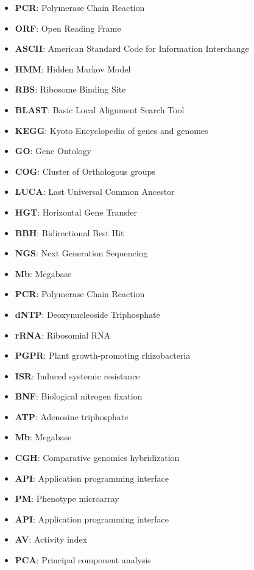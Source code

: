 \begin{itemize}
\item \textbf{PCR}: Polymerase Chain Reaction
\item \textbf{ORF}: Open Reading Frame
\item \textbf{ASCII}: American Standard Code for Information Interchange
\item \textbf{HMM}: Hidden Markov Model
\item \textbf{RBS}: Ribosome Binding Site
\item \textbf{BLAST}: Basic Local Alignment Search Tool
\item \textbf{KEGG}: Kyoto Encyclopedia of genes and genomes
\item \textbf{GO}: Gene Ontology
\item \textbf{COG}: Cluster of Orthologous groups
\item \textbf{LUCA}: Last Universal Common Ancestor
\item \textbf{HGT}: Horizontal Gene Transfer
\item \textbf{BBH}: Bidirectional Best Hit
\item \textbf{NGS}: Next Generation Sequencing
\item \textbf{Mb}: Megabase
\item \textbf{PCR}: Polymerase Chain Reaction
\item \textbf{dNTP}: Deoxynucleoside Triphosphate
\item \textbf{rRNA}: Ribosomial RNA
\item \textbf{PGPR}: Plant growth-promoting rhizobacteria
\item \textbf{ISR}: Induced systemic resistance
\item \textbf{BNF}: Biological nitrogen fixation
\item \textbf{ATP}: Adenosine triphosphate
\item \textbf{Mb}: Megabase
\item \textbf{CGH}: Comparative genomics hybridization
\item \textbf{API}: Application programming interface
\item \textbf{PM}: Phenotype microarray
\item \textbf{API}: Application programming interface
\item \textbf{AV}: Activity index
\item \textbf{PCA}: Principal component analysis
\end{itemize}